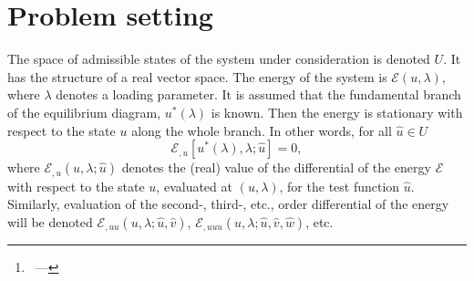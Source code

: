 \documentclass[12pt, final]{scrartcl}
\theoremstyle{definition}
\newcommand{\E}{\mathcal E}
\begin{document}
\title{\sbtitle}
\author{\sbauthor\thanks{\sbaddress~--- \sbemail}}
\maketitle

\begin{abstract}
  These are my notes on the LSK method for the analysis of the stability and bifurcation(s) of a conservative
  system. These notes are based on several references: Koiter's initial PhD thesis~\parencite{koit1945} as well as some
  graphical illustrations from his lecture notes~\parencite{koit2009}. I enjoyed the concise presentation of
  \textcite{nguy2000} as well as the lecture notes of \textcite{tria2017}. Finally, the chapter by \textcite{poti1987}
  helped me clear some issues.

  These notes by Sébastien Brisard are licensed under a Creative Commons Attribution 4.0 International License. To view
  a copy of this license, visit \url{http://creativecommons.org/licenses/by/4.0/}.

  I hope the reader will find these notes useful, even though there are still a few points which I do not fully
  understand (they are clearly indicated in the text).
\end{abstract}

\section{Problem setting}

The space of admissible states of the system under consideration is denoted \(U\). It has the structure of a real vector
space. The energy of the system is \(\E(u, \lambda)\), where \(\lambda\) denotes a loading parameter. It is assumed that the
fundamental branch of the equilibrium diagram, \(u^\ast(\lambda)\) is known. Then the energy is stationary with respect to the
state \(u\) along the whole branch. In other words, for all \(\hat{u} \in U\)
\begin{equation}
  \label{eq:20221227184138}
  \E_{,u}[u^{\ast}(\lambda), \lambda; \hat{u}]=0,
\end{equation}
where \(\E_{,u}(u, \lambda; \hat{u})\) denotes the (real) value of the differential of the energy \(\E\) with respect to the
state \(u\), evaluated at \((u, \lambda)\), for the test function \(\hat{u}\). Similarly, evaluation of the second-, third-,
etc., order differential of the energy will be denoted \(\E_{,uu}(u, \lambda; \hat{u}, \hat{v})\),
\(\E_{,uuu}(u, \lambda; \hat{u}, \hat{v}, \hat{w})\), etc.
\end{document}
